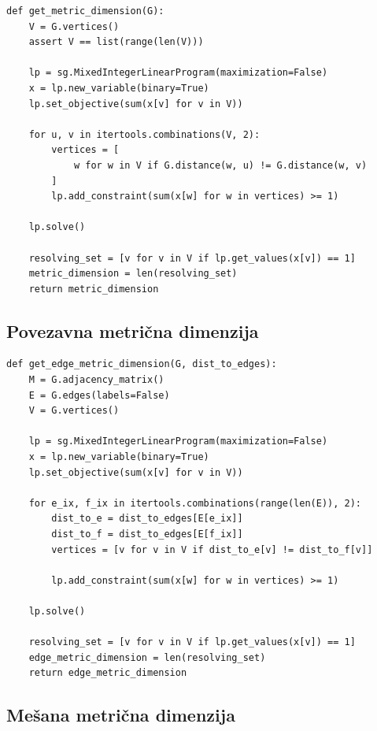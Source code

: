 \documentclass[a4paper,12pt]{article}
\theoremstyle{definition}
\theoremstyle{remark}
\theoremstyle{definition}
\begin{document}
\begin{lstlisting}
def get_metric_dimension(G):
    V = G.vertices()
    assert V == list(range(len(V)))

    lp = sg.MixedIntegerLinearProgram(maximization=False)
    x = lp.new_variable(binary=True)
    lp.set_objective(sum(x[v] for v in V))

    for u, v in itertools.combinations(V, 2):
        vertices = [
            w for w in V if G.distance(w, u) != G.distance(w, v)
        ]
        lp.add_constraint(sum(x[w] for w in vertices) >= 1)

    lp.solve()

    resolving_set = [v for v in V if lp.get_values(x[v]) == 1]
    metric_dimension = len(resolving_set)
    return metric_dimension
\end{lstlisting}

\newpage
\subsection*{Povezavna metrična dimenzija}

\begin{lstlisting}
def get_edge_metric_dimension(G, dist_to_edges):
    M = G.adjacency_matrix()
    E = G.edges(labels=False)
    V = G.vertices()

    lp = sg.MixedIntegerLinearProgram(maximization=False)
    x = lp.new_variable(binary=True)
    lp.set_objective(sum(x[v] for v in V))

    for e_ix, f_ix in itertools.combinations(range(len(E)), 2):
        dist_to_e = dist_to_edges[E[e_ix]]
        dist_to_f = dist_to_edges[E[f_ix]]
        vertices = [v for v in V if dist_to_e[v] != dist_to_f[v]]

        lp.add_constraint(sum(x[w] for w in vertices) >= 1)

    lp.solve()

    resolving_set = [v for v in V if lp.get_values(x[v]) == 1]
    edge_metric_dimension = len(resolving_set)
    return edge_metric_dimension
\end{lstlisting}

\subsection*{Mešana metrična dimenzija}
\end{document}
